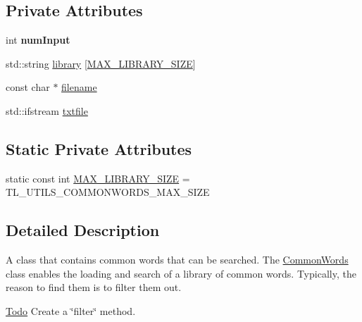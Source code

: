 \subsection*{Private Attributes}
\begin{DoxyCompactItemize}
\item 
\hypertarget{classTurnLeft_1_1Utils_1_1CommonWords_a7e82c55a2d38a7e3148c58ce62c1c50a}{
int {\bfseries numInput}}
\label{classTurnLeft_1_1Utils_1_1CommonWords_a7e82c55a2d38a7e3148c58ce62c1c50a}

\item 
std::string \hyperlink{classTurnLeft_1_1Utils_1_1CommonWords_a682e0ab0f53b53cca62ff898c0fb58de}{library} \mbox{[}\hyperlink{classTurnLeft_1_1Utils_1_1CommonWords_afc0cb129b7578c3ea5bf63cf3284e630}{MAX\_\-LIBRARY\_\-SIZE}\mbox{]}
\item 
const char $\ast$ \hyperlink{classTurnLeft_1_1Utils_1_1CommonWords_aad1fbed4daae28a7e3023f2dcca967bc}{filename}
\item 
std::ifstream \hyperlink{classTurnLeft_1_1Utils_1_1CommonWords_af284f9a4b03f822914fe9a7c6e4e267c}{txtfile}
\end{DoxyCompactItemize}
\subsection*{Static Private Attributes}
\begin{DoxyCompactItemize}
\item 
static const int \hyperlink{classTurnLeft_1_1Utils_1_1CommonWords_afc0cb129b7578c3ea5bf63cf3284e630}{MAX\_\-LIBRARY\_\-SIZE} = TL\_\-UTILS\_\-COMMONWORDS\_\-MAX\_\-SIZE
\end{DoxyCompactItemize}


\subsection{Detailed Description}
A class that contains common words that can be searched. The \hyperlink{classTurnLeft_1_1Utils_1_1CommonWords}{CommonWords} class enables the loading and search of a library of common words. Typically, the reason to find them is to filter them out. \begin{Desc}
\item[\hyperlink{todo__todo000001}{Todo}]Create a \char`\"{}filter\char`\"{} method. \end{Desc}


